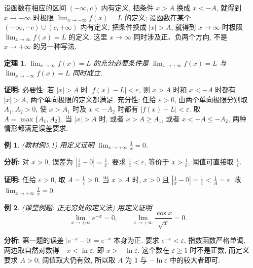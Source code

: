 \documentclass[UTF8,openany]{ctexbook}
\theoremstyle{chinesetextbook}
\newtheorem{example}{例}[section]
\newtheorem{theorem}{定理}[section]
\newenvironment{cnproof}{\par\indent\textbf{证明:} \ignorespaces}{\par}
\begin{document}
设函数在相应的区间 $(-\infty,c)$ 内有定义, 把条件 $x>A$ 换成 $x<-A$, 就得到 $x\to-\infty$ 时极限 $\displaystyle\lim_{x\to-\infty}f(x)=L$ 的定义; 设函数在某个 $(-\infty,-c)\cup(c,+\infty)$ 内有定义, 把条件换成 $|x|>A$, 就得到 $x\to\infty$ 时极限 $\displaystyle\lim_{x\to\infty}f(x)=L$ 的定义. 这里 $x\to\infty$ 同时涉及正、负两个方向, 不是 $x\to+\infty$ 的另一种写法.
\begin{theorem}
$\displaystyle \lim_{x\to\infty}f(x)=L$ 的充分必要条件是 $\displaystyle\lim_{x\to+\infty}f(x)=L$ 与 $\displaystyle\lim_{x\to-\infty}f(x)=L$ 同时成立.
\end{theorem}
\begin{cnproof}
必要性: 若 $|x|>A$ 时 $|f(x)-L|<\varepsilon$, 则 $x>A$ 时和 $x<-A$ 时都有 $|x|>A$, 两个单向极限的定义都满足. 充分性: 任给 $\varepsilon>0$, 由两个单向极限分别取 $A_1,A_2>0$, 使 $x>A_1$ 时及 $x<-A_2$ 时都有 $|f(x)-L|<\varepsilon$. 取 $A=\max\{A_1,A_2\}$, 当 $|x|>A$ 时, 或者 $x>A\ge A_1$, 或者 $x<-A\le-A_2$, 两种情形都满足误差要求.
\end{cnproof}
\begin{example}
\textnormal{(教材例5.1)} 用定义证明 $\displaystyle \lim_{x\to+\infty}\frac1x=0$.
\end{example}
\par\indent\textbf{分析:} 对 $x>0$, 误差为 $\displaystyle\left|\frac1x-0\right|=\frac1x$. 要求 $\displaystyle\frac1x<\varepsilon$, 等价于 $\displaystyle x>\frac1\varepsilon$, 阈值可直接取 $\displaystyle\frac1\varepsilon$.
\begin{cnproof}
任给 $\varepsilon>0$, 取 $\displaystyle A=\frac1\varepsilon>0$. 当 $x>A$ 时, $x>0$ 且 $\displaystyle\left|\frac1x-0\right|=\frac1x<\frac1A=\varepsilon$. 故 $\displaystyle\lim_{x\to+\infty}\frac1x=0$.
\end{cnproof}
\begin{example}
\textnormal{(课堂例题: 正无穷处的定义法)} 用定义证明
\[
\lim_{x\to+\infty}e^{-x}=0,\qquad
\lim_{x\to+\infty}\frac{\cos x}{\sqrt x}=0.
\]
\end{example}
\par\indent\textbf{分析:} 第一题的误差 $|e^{-x}-0|=e^{-x}$ 本身为正. 要求 $e^{-x}<\varepsilon$, 指数函数严格单调, 两边取自然对数得 $-x<\ln\varepsilon$, 即 $x>-\ln\varepsilon$. 这个数在 $\varepsilon\ge1$ 时不是正数, 而定义要求 $A>0$; 阈值取大仍有效, 所以取 $A$ 为 $1$ 与 $-\ln\varepsilon$ 中的较大者即可.
\end{document}

